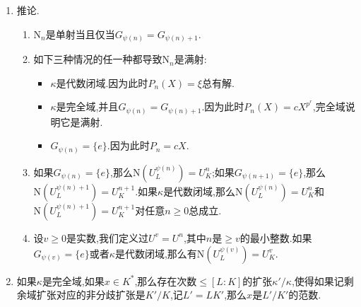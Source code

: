 \begin{enumerate}
\begin{proof}
		按照归纳假设,如果$n=0$则$\mathrm{N}'$和$\mathrm{N}''$被加性多项式$P'$和$P''$诱导;如果$n>0$则$\mathrm{N}'$和$\mathrm{N}''$被乘性多项式$P'$和$P''$诱导.于是$\mathrm{N}_n$被加性或者乘性多项式$P_n=P'\circ P''$诱导.结合归纳假设和素数阶情况就得到次数的结论.最后这个正合列,我们解释过$\theta$是单射,另外$\mathrm{N}_n$的核的阶数整除$\deg_s(P_n)$,但是按照$\mathrm{N}(\sigma(\pi)/\pi)=1$,说明这个核包含了$\mathrm{im}\theta$,而$\mathrm{im}\theta$的阶数恰好是$[G_{\psi(n)}:G_{\psi(n)+1}]=\deg_s(P_n)$,于是必须有$\mathrm{im}\theta=\ker(\mathrm{N}_n)$.
	\end{proof}
    \item 推论.
    \begin{enumerate}
    	\item $\mathrm{N}_n$是单射当且仅当$G_{\psi(n)}=G_{\psi(n)+1}$.
    	\item 如下三种情况的任一种都导致$\mathrm{N}_n$是满射:
    	\begin{itemize}
    		\item $\kappa$是代数闭域.因为此时$P_n(X)=\xi$总有解.
    		\item $\kappa$是完全域,并且$G_{\psi(n)}=G_{\psi(n)+1}$.因为此时$P_n(X)=cX^{p^r}$,完全域说明它是满射.
    		\item $G_{\psi(n)}=\{e\}$.因为此时$P_n=cX$.
    	\end{itemize}
        \item 如果$G_{\psi(n)}=\{e\}$,那么$\mathrm{N}(U_L^{\psi(n)})=U_K^n$;如果$G_{\psi(n+1)}=\{e\}$,那么$\mathrm{N}(U_L^{\psi(n)+1})=U_K^{n+1}$.如果$\kappa$是代数闭域,那么$\mathrm{N}(U_L^{\psi(n)})=U_K^n$和$\mathrm{N}(U_L^{\psi(n)+1})=U_K^{n+1}$对任意$n\ge0$总成立.
        \item 设$v\ge0$是实数,我们定义过$U^v=U^n$,其中$n$是$\ge v$的最小整数.如果$G_{\psi(v)}=\{e\}$或者$\kappa$是代数闭域,那么有$\mathrm{N}(U_L^{\psi(v)})=U_K^v$.
    \end{enumerate}
    \item 如果$\kappa$是完全域,如果$x\in K^*$,那么存在次数$\le[L:K]$的扩张$\kappa'/\kappa$,使得如果记剩余域扩张对应的非分歧扩张是$K'/K$,记$L'=LK'$,那么$x$是$L'/K'$的范数.
\end{enumerate}

